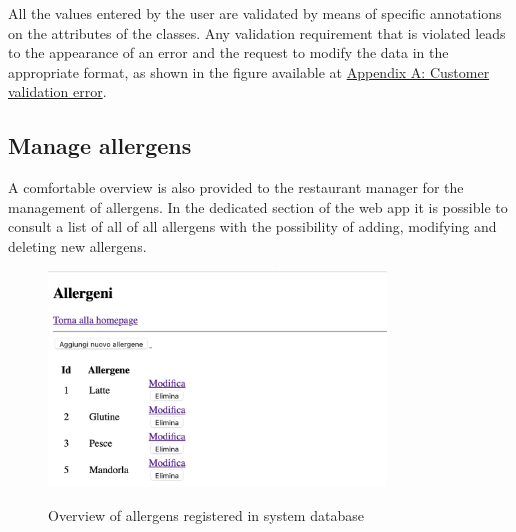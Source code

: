 \documentclass{article}
\begin{document}
    All the values entered by the user are validated by means of specific annotations on the attributes of the classes. Any validation requirement that is violated leads to the appearance of an error and the request to modify the data in the appropriate format, as shown in the figure available at \hyperref[fig:customer_validation_error]{Appendix A: Customer validation error}.


    \subsection*{Manage allergens}
    A comfortable overview is also provided to the restaurant manager for the management of allergens. In the dedicated section of the web app it is possible to consult a list of all of all allergens with the possibility of adding, modifying and deleting new allergens.

\vspace{5mm}

    \begin{figure}[H]
        \centering
        \includegraphics[width=0.8\textwidth]{images/allergens_overview.png}
        \label{fig:allergens_overview}
        \caption{Overview of allergens registered in system database}
    \end{figure}

\vspace{5mm}
\end{document}

